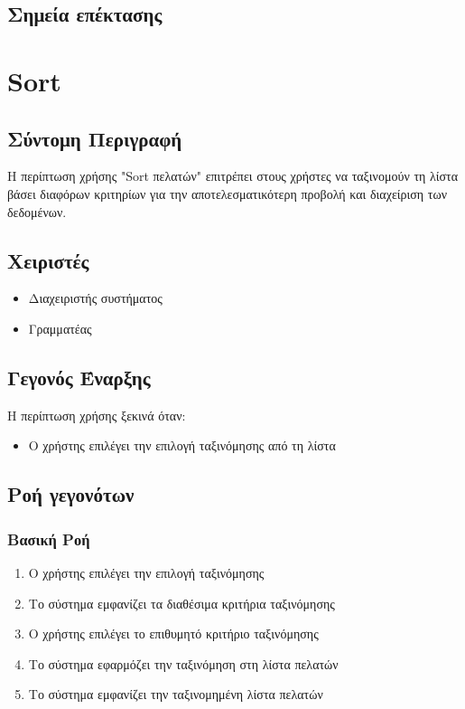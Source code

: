 \documentclass[12pt,a4paper,twoside]{book}
\begin{document}
\subsection{Σημεία επέκτασης}


\section{Sort}

\subsection{Σύντομη Περιγραφή}
Η περίπτωση χρήσης "Sort πελατών" επιτρέπει στους χρήστες να ταξινομούν τη λίστα  βάσει διαφόρων κριτηρίων για την αποτελεσματικότερη προβολή και διαχείριση των δεδομένων. %

\subsection{Χειριστές}
\begin{itemize}
  \item Διαχειριστής συστήματος
  \item Γραμματέας
\end{itemize}

\subsection{Γεγονός Έναρξης}
Η περίπτωση χρήσης ξεκινά όταν:
\begin{itemize}
  \item Ο χρήστης επιλέγει την επιλογή ταξινόμησης από τη λίστα %
\end{itemize}

\subsection{Ροή γεγονότων}

\subsubsection{Βασική Ροή}
\begin{enumerate}
  \item Ο χρήστης επιλέγει την επιλογή ταξινόμησης
  \item Το σύστημα εμφανίζει τα διαθέσιμα κριτήρια ταξινόμησης %
  \item Ο χρήστης επιλέγει το επιθυμητό κριτήριο ταξινόμησης
  \item Το σύστημα εφαρμόζει την ταξινόμηση στη λίστα πελατών
  \item Το σύστημα εμφανίζει την ταξινομημένη λίστα πελατών
\end{enumerate}
\end{document}
